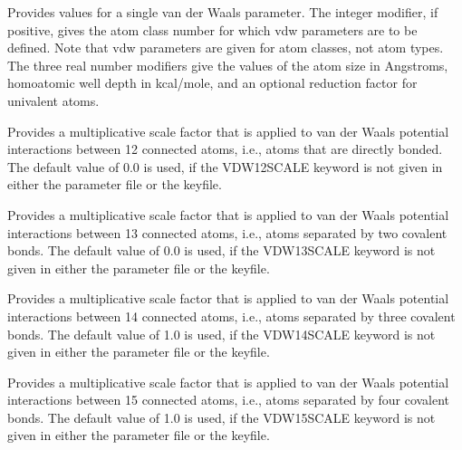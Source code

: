 \documentclass[letterpaper,11pt,english]{sphinxmanual}
\begin{document}



  Provides values for a single van der Waals parameter. The integer modifier, if positive, gives the atom class number for which vdw parameters are to be defined. Note that vdw parameters are given for atom classes, not atom types. The three real number modifiers give the values of the atom size in Angstroms, homoatomic well depth in kcal/mole, and an optional reduction factor for univalent atoms.

  Provides a multiplicative scale factor that is applied to van der Waals potential interactions between 1\sphinxhyphen{}2 connected atoms, i.e., atoms that are directly bonded. The default value of 0.0 is used, if the VDW\sphinxhyphen{}12\sphinxhyphen{}SCALE keyword is not given in either the parameter file or the keyfile.

  Provides a multiplicative scale factor that is applied to van der Waals potential interactions between 1\sphinxhyphen{}3 connected atoms, i.e., atoms separated by two covalent bonds. The default value of 0.0 is used, if the VDW\sphinxhyphen{}13\sphinxhyphen{}SCALE keyword is not given in either the parameter file or the keyfile.

  Provides a multiplicative scale factor that is applied to van der Waals potential interactions between 1\sphinxhyphen{}4 connected atoms, i.e., atoms separated by three covalent bonds. The default value of 1.0 is used, if the VDW\sphinxhyphen{}14\sphinxhyphen{}SCALE keyword is not given in either the parameter file or the keyfile.

  Provides a multiplicative scale factor that is applied to van der Waals potential interactions between 1\sphinxhyphen{}5 connected atoms, i.e., atoms separated by four covalent bonds. The default value of 1.0 is used, if the VDW\sphinxhyphen{}15\sphinxhyphen{}SCALE keyword is not given in either the parameter file or the keyfile.

\end{document}

